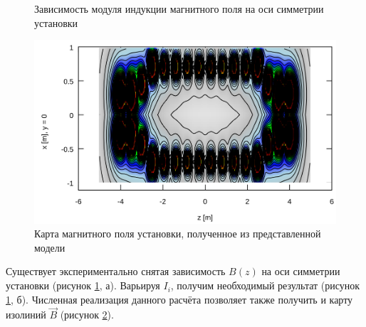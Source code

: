 \begin{figure}[h]
	\begin{minipage}[h]{0.9\linewidth}
	\end{minipage}
	\vfill
	\begin{minipage}[h]{0.9\linewidth}
	\end{minipage}
	\caption{Зависимость модуля индукции магнитного поля на оси симметрии установки}
	\label{fig:B_on_axis}
\end{figure}
\begin{figure}[h!]
	\centering
	\includegraphics[width=0.8\linewidth]{fig/ch5/mymapB_fine}
	\caption{Карта магнитного поля установки, полученное из представленной модели}
	\label{fig:mymapB_fine}
\end{figure}

Существует экспериментально снятая зависимость $B(z)$ на оси симметрии установки (рисунок \ref{fig:B_on_axis}, а). Варьируя $I_i$, получим необходимый результат (рисунок \ref{fig:B_on_axis}, б). Численная реализация данного расчёта позволяет также получить и карту изолиний $\vec{B}$ (рисунок \ref{fig:mymapB_fine}).



